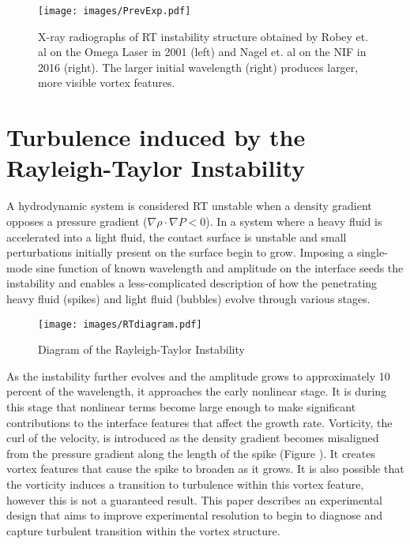 \documentclass[%
 aip,
 amsmath,amssymb,
 reprint,
 floatfix
]{revtex4-1}
\begin{document}
  \begin{figure}
 \begin{center}
 \texttt{[image: images/PrevExp.pdf]}
 \caption{X-ray radiographs of RT instability structure obtained by Robey et. al on the Omega Laser in 2001 (left) and Nagel et. al on the NIF in 2016 (right). The larger initial wavelength (right) produces larger, more visible vortex features. } 
 \label{fig:Reshock Data}
 \end{center}
 \end{figure}


\section{Turbulence induced by the Rayleigh-Taylor Instability }

A hydrodynamic system is considered RT unstable when a density gradient opposes a pressure gradient ($\nabla \rho \cdot \nabla P < 0$).  In a system where a heavy fluid is accelerated into a light fluid, the contact surface is unstable and small perturbations initially present on the surface begin to grow. \cite{Rayleigh, taylor1950instability} Imposing a single-mode sine function of known wavelength and amplitude on the interface seeds the instability and enables a less-complicated description of how the penetrating heavy fluid (spikes) and light fluid (bubbles) evolve through various stages. \cite{jacobs1996experimental,roberts2016effects}  
 
  \begin{figure}
 \begin{center}
 \texttt{[image: images/RTdiagram.pdf]}
 \caption{Diagram of the Rayleigh-Taylor Instability } 
 \label{fig:RTdiagram}
 \end{center}
 \end{figure}
 
As the instability further evolves and the amplitude grows to approximately 10 percent of the wavelength, it approaches the early nonlinear stage. \cite{Zhou:2017, zhou2019turbulent} It is during this stage that nonlinear terms become large enough to make significant contributions to the interface features that affect the growth rate.\cite{Zhou:2017, robey2003onset}  Vorticity, the curl of the velocity,  is introduced as the density gradient becomes misaligned from the pressure gradient along the length of the spike (Figure ).  It creates vortex features that cause the spike to broaden as it grows. It is also possible that the vorticity induces a transition to turbulence within this vortex feature, however this is not a guaranteed result.    \cite{jacobs1996experimental}  This paper describes an experimental design that aims to improve experimental resolution to begin to diagnose and capture turbulent transition within the vortex structure.    
\end{document}
